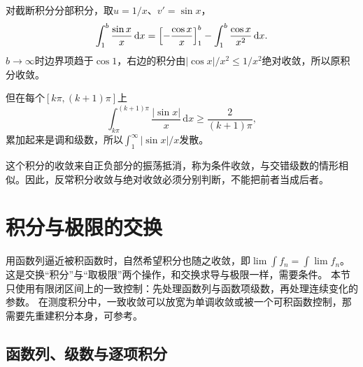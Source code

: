 \begin{example}
\label{ex:ru-sinc-conditional-convergence}
对截断积分分部积分，取$u=1/x$、$v'=\sin x$，
\[
 \int_1^b\frac{\sin x}x\,\mathrm dx=\Bigl[-\frac{\cos x}x\Bigr]_1^b-\int_1^b\frac{\cos x}{x^2}\,\mathrm dx.
\]
$b\to\infty$时边界项趋于$\cos1$，右边的积分由$|\cos x|/x^2\leq1/x^2$绝对收敛，所以原积分收敛。

但在每个$[k\pi,(k+1)\pi]$上
\[
 \int_{k\pi}^{(k+1)\pi}\frac{|\sin x|}x\,\mathrm dx\geq\frac2{(k+1)\pi},
\]
累加起来是调和级数，所以$\int_1^\infty|\sin x|/x$发散。
\end{example}

这个积分的收敛来自正负部分的振荡抵消，称为条件收敛，与交错级数的情形相似。因此，反常积分收敛与绝对收敛必须分别判断，不能把前者当成后者。
\section{积分与极限的交换}
\label{sec:ru-limit-interchange}

用函数列逼近被积函数时，自然希望积分也随之收敛，即$\lim\int f_n=\int\lim f_n$。这是交换“积分”与“取极限”两个操作，和交换求导与极限一样，需要条件。
本节只使用有限闭区间上的一致控制：先处理函数列与函数项级数，再处理连续变化的参数。
在测度积分中，一致收敛可以放宽为单调收敛或被一个可积函数控制，那需要先重建积分本身，可参考。

\subsection{函数列、级数与逐项积分}
\label{sec:ru-termwise-integration}

